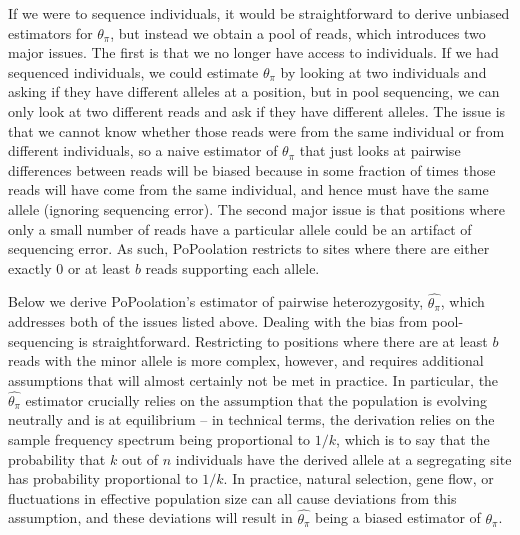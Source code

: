 \documentclass[a4paper,fontsize=9pt,DIV=14]{scrartcl}
\newcommand{\samplesize}{n}
\newcommand{\thetapi}{\widehat{\theta_\pi}}
\begin{document}
If we were to sequence individuals, it would be straightforward to derive unbiased estimators for $\theta_\pi$, but instead we obtain a pool of reads, which introduces two major issues.  The first is that we no longer have access to individuals.  If we had sequenced individuals, we could estimate $\theta_\pi$ by looking at two individuals and asking if they have different alleles at a position, but in pool sequencing, we can only look at two different reads and ask if they have different alleles.  The issue is that we cannot know whether those reads were from the same individual or from different individuals, so a naive estimator of $\theta_\pi$ that just looks at pairwise differences between reads will be biased because in some fraction of times those reads will have come from the same individual, and hence must have the same allele (ignoring sequencing error).  The second major issue is that positions where only a small number of reads have a particular allele could be an artifact of sequencing error.  As such, PoPoolation restricts to sites where there are either exactly $0$ or at least $b$ reads supporting each allele.

Below we derive PoPoolation's estimator of pairwise heterozygosity, $\thetapi$, which addresses both of the issues listed above.  Dealing with the bias from pool-sequencing is straightforward.  Restricting to positions where there are at least $b$ reads with the minor allele is more complex, however, and requires additional assumptions that will almost certainly not be met in practice.  In particular, the $\thetapi$ estimator crucially relies on the assumption that the population is evolving neutrally and is at equilibrium -- in technical terms, the derivation relies on the sample frequency spectrum being proportional to $1/k$, which is to say that the probability that $k$ out of $\samplesize$ individuals have the derived allele at a segregating site has probability proportional to $1/k$.  In practice, natural selection, gene flow, or fluctuations in effective population size can all cause deviations from this assumption, and these deviations will result in $\thetapi$ being a biased estimator of $\theta_\pi$.


\end{document}

